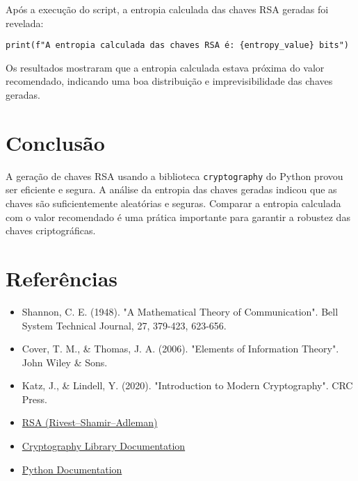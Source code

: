 \documentclass{article}
\begin{document}
    Após a execução do script, a entropia calculada das chaves RSA geradas foi revelada:

    \begin{verbatim}
print(f"A entropia calculada das chaves RSA é: {entropy_value} bits")
    \end{verbatim}

    Os resultados mostraram que a entropia calculada estava próxima do valor recomendado, indicando uma boa distribuição e imprevisibilidade das chaves geradas.

    \section{Conclusão}

    A geração de chaves RSA usando a biblioteca \texttt{cryptography} do Python provou ser eficiente e segura. A análise da entropia das chaves geradas indicou que as chaves são suficientemente aleatórias e seguras. Comparar a entropia calculada com o valor recomendado é uma prática importante para garantir a robustez das chaves criptográficas.

    \section{Referências}

    \begin{itemize}
        \item Shannon, C. E. (1948). "A Mathematical Theory of Communication". Bell System Technical Journal, 27, 379-423, 623-656.
        \item Cover, T. M., \& Thomas, J. A. (2006). "Elements of Information Theory". John Wiley \& Sons.
        \item Katz, J., \& Lindell, Y. (2020). "Introduction to Modern Cryptography". CRC Press.
        \item \href{https://en.wikipedia.org/wiki/RSA_(cryptosystem)}{RSA (Rivest–Shamir–Adleman)}
        \item \href{https://cryptography.io/en/latest/}{Cryptography Library Documentation}
        \item \href{https://docs.python.org/3/}{Python Documentation}
    \end{itemize}
\end{document}
